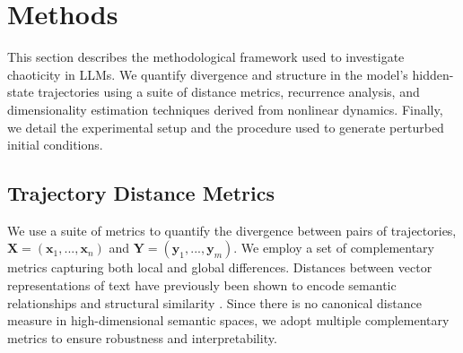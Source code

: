 \documentclass[a4paper,12pt]{article}
\begin{document}
    \section{Methods}
    \label{sec:methods}

    This section describes the methodological framework used to investigate chaoticity in LLMs. We quantify divergence and structure in the model's hidden-state trajectories using a suite of distance metrics, recurrence analysis, and dimensionality estimation techniques derived from nonlinear dynamics. Finally, we detail the experimental setup and the procedure used to generate perturbed initial conditions.

    \subsection{Trajectory Distance Metrics}
    \label{subsec:trajectory_distance_metrics}
    We use a suite of metrics to quantify the divergence between pairs of trajectories, $\mathbf{X} = (\mathbf{x}_1, ..., \mathbf{x}_n)$ and $\mathbf{Y} = (\mathbf{y}_1, ..., \mathbf{y}_m)$. We employ a set of complementary metrics capturing both local and global differences. Distances between vector representations of text have previously been shown to encode semantic relationships and structural similarity \cite{text2vec, reimers2019sentencebertsentenceembeddingsusing}. Since there is no canonical distance measure in high-dimensional semantic spaces, we adopt multiple complementary metrics to ensure robustness and interpretability. 


\end{document}
